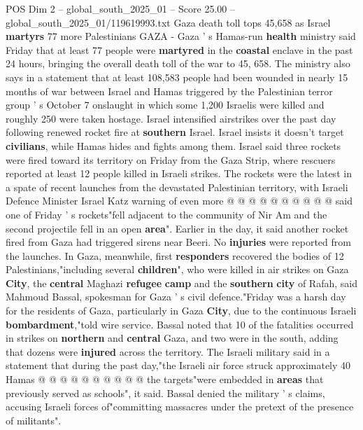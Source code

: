 \begin{textsample}{POS Dim 2 – global\_south\_2025\_01 – Score 25.00 – global\_south\_2025\_01/119619993.txt}  \label{ex:f2_pos_317}
Gaza death toll tops 45,658 as Israel \textbf{martyrs} 77 more Palestinians GAZA - Gaza ' s Hamas-run \textbf{health} ministry said Friday that at least 77 people were \textbf{martyred} in the \textbf{coastal} enclave in the past 24 hours, bringing the overall death toll of the war to 45, 658.
The ministry also says in a statement that at least 108,583 people had been wounded in nearly 15 months of war between Israel and Hamas triggered by the Palestinian terror group ' s October 7 onslaught in which some 1,200 Israelis were killed and roughly 250 were taken hostage.
Israel intensified airstrikes over the past day following renewed rocket fire at \textbf{southern} Israel.
Israel insists it doesn't target \textbf{civilians}, while Hamas hides and fights among them.
Israel said three rockets were fired toward its territory on Friday from the Gaza Strip, where rescuers reported at least 12 people killed in Israeli strikes.
The rockets were the latest in a spate of recent launches from the devastated Palestinian territory, with Israeli Defence Minister Israel Katz warning of even more @ @ @ @ @ @ @ @ @ @ said one of Friday ' s rockets"fell adjacent to the community of Nir Am and the second projectile fell in an open \textbf{area}".
Earlier in the day, it said another rocket fired from Gaza had triggered sirens near Beeri.
No \textbf{injuries} were reported from the launches.
In Gaza, meanwhile, first \textbf{responders} recovered the bodies of 12 Palestinians,"including several \textbf{children}", who were killed in air strikes on Gaza \textbf{City}, the \textbf{central} Maghazi \textbf{refugee} \textbf{camp} and the \textbf{southern} \textbf{city} of Rafah, said Mahmoud Bassal, spokesman for Gaza ' s civil defence."Friday was a harsh day for the residents of Gaza, particularly in Gaza \textbf{City}, due to the continuous Israeli \textbf{bombardment},"told wire service.
Bassal noted that 10 of the fatalities occurred in strikes on \textbf{northern} and \textbf{central} Gaza, and two were in the south, adding that dozens were \textbf{injured} across the territory.
The Israeli military said in a statement that during the past day,"the Israeli air force struck approximately 40 Hamas @ @ @ @ @ @ @ @ @ @ the targets"were embedded in \textbf{areas} that previously served as schools", it said.
Bassal denied the military ' s claims, accusing Israeli forces of"committing massacres under the pretext of the presence of militants".

\end{textsample}
